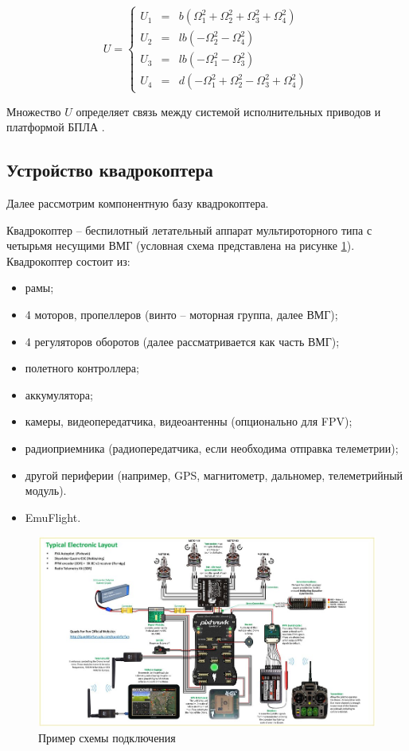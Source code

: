 \begin{equation}
U = \left\{ \begin{aligned}
U_{1}&=&b(\Omega_{1}^2+\Omega_{2}^2+\Omega_{3}^2+\Omega_{4}^2)\\
U_{2}&=&lb(-\Omega_{2}^2-\Omega_{4}^2)\\
U_{3}&=&lb(-\Omega_{1}^2-\Omega_{3}^2)\\
U_{4}&=&d(-\Omega_{1}^2+\Omega_{2}^2-\Omega_{3}^2+\Omega_{4}^2)
\end{aligned} \right.
\end{equation}

Множество \(U\) определяет связь между системой исполнительных приводов и платформой БПЛА \cite{mathmodel}.

\subsection{Устройство квадрокоптера}
Далее рассмотрим компонентную базу квадрокоптера.

Квадрокоптер -- беспилотный летательный аппарат мультироторного типа с четырьмя несущими ВМГ (условная схема представлена на рисунке \ref{fig:pix}).
Квадрокоптер состоит из:
\begin{itemize}
	\item рамы;
	\item 4 моторов, пропеллеров (винто -- моторная группа, далее ВМГ);
	\item 4 регуляторов оборотов (далее рассматривается как часть ВМГ);
	\item полетного контроллера;
	\item аккумулятора;
	\item камеры, видеопередатчика, видеоантенны (опционально для FPV);
	\item радиоприемника (радиопередатчика, если необходима отправка телеметрии);
	\item другой периферии (например, GPS, магнитометр, дальномер, телеметрийный модуль).
	\item EmuFlight.
\end{itemize}

 \begin{figure}[H]
 	\centering
 	\includegraphics[width=0.5\linewidth]{../RW/pics/pix}
 	\caption{Пример схемы подключения
 	}
 	\label{fig:pix}
 \end{figure}

